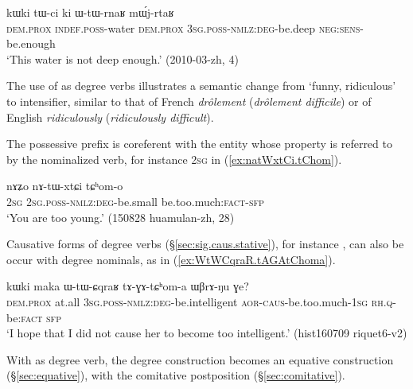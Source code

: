 \begin{exe}
\ex \label{ex:WtWrnaR.mWjrtaR}
\gll kɯki tɯ-ci ki ɯ-tɯ-rnaʁ mɯ́j-rtaʁ \\
\textsc{dem}.\textsc{prox} \textsc{indef}.\textsc{poss}-water \textsc{dem}.\textsc{prox} \textsc{3sg}.\textsc{poss}-\textsc{nmlz}:\textsc{deg}-be.deep \textsc{neg}:\textsc{sens}-be.enough \\
\glt `This water is not deep enough.' (2010-03-zh, 4)
\end{exe}

The use of  as degree verbs illustrates a semantic change from `funny, ridiculous' to intensifier, similar to that of French \textit{drôlement} (\textit{drôlement difficile}) or of English \textit{ridiculously} (\textit{ridiculously difficult}).

The possessive prefix is coreferent with the entity whose property is referred to by the nominalized verb, for instance \textsc{2sg} in (\ref{ex:natWxtCi.tChom}). 

\begin{exe}
\ex \label{ex:natWxtCi.tChom}
\gll nɤʑo nɤ-tɯ-xtɕi tɕʰom-o \\
\textsc{2sg} \textsc{2sg}.\textsc{poss}-\textsc{nmlz}:\textsc{deg}-be.small be.too.much:\textsc{fact}-\textsc{sfp} \\
\glt `You are too young.' (150828 huamulan-zh, 28)
\end{exe}

Causative forms of degree verbs (§\ref{sec:sig.caus.stative}), for instance , can also be occur with degree nominals, as in (\ref{ex:WtWCqraR.tAGAtChoma}).

\begin{exe}
\ex \label{ex:WtWCqraR.tAGAtChoma}
\gll kɯki maka ɯ-tɯ-ɕqraʁ tɤ-ɣɤ-tɕʰom-a ɯβrɤ-ŋu ɣe? \\
\textsc{dem}.\textsc{prox} at.all  \textsc{3sg}.\textsc{poss}-\textsc{nmlz}:\textsc{deg}-be.intelligent \textsc{aor}-\textsc{caus}-be.too.much-\textsc{1sg} \textsc{rh}.\textsc{q}-be:\textsc{fact} \textsc{sfp} \\
\glt `I hope that I did not cause her to become too intelligent.' (hist160709 riquet6-v2)
\end{exe}

With  as degree verb, the degree construction becomes an equative construction (§\ref{sec:equative}), with the comitative postposition  (§\ref{sec:comitative}). 

